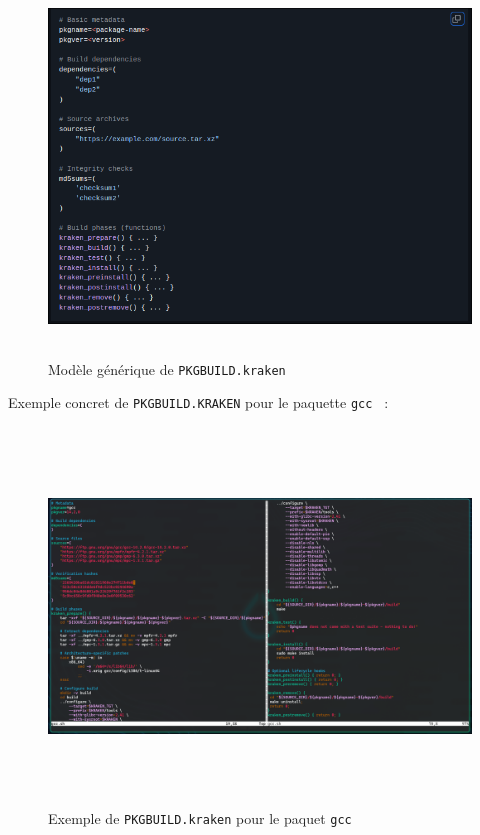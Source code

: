 \begin{figure}[H]
  \centering
  \includegraphics[width=1\textwidth, height=10cm]{images_pfe/pkgbuildkrakenmodle.png}
  \caption{Modèle générique de \texttt{PKGBUILD.kraken}}
  \label{fig:pkgtemplate}
\end{figure}
\clearpage
Exemple concret de \texttt{PKGBUILD.KRAKEN} pour le paquette \texttt{gcc } :
\begin{figure}[H]
  \centering
  \includegraphics[width=1\textwidth, height=10cm]{images_pfe/exemplepgkbuldgcc.png}
  \caption{Exemple de \texttt{PKGBUILD.kraken} pour le paquet \texttt{gcc}}
  \label{fig:pkgbuildgcc}
\end{figure}

